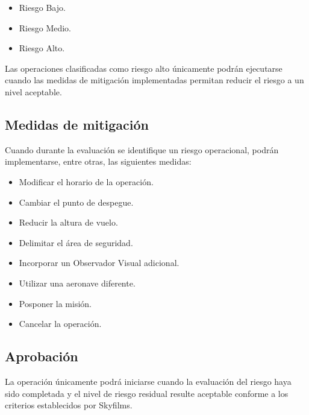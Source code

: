 \begin{itemize}

\item Riesgo Bajo.

\item Riesgo Medio.

\item Riesgo Alto.

\end{itemize}

Las operaciones clasificadas como riesgo alto únicamente podrán ejecutarse cuando las medidas de mitigación implementadas permitan reducir el riesgo a un nivel aceptable.

\subsection{Medidas de mitigación}

Cuando durante la evaluación se identifique un riesgo operacional, podrán implementarse, entre otras, las siguientes medidas:

\begin{itemize}

\item Modificar el horario de la operación.

\item Cambiar el punto de despegue.

\item Reducir la altura de vuelo.

\item Delimitar el área de seguridad.

\item Incorporar un Observador Visual adicional.

\item Utilizar una aeronave diferente.

\item Posponer la misión.

\item Cancelar la operación.

\end{itemize}


\subsection{Aprobación}

La operación únicamente podrá iniciarse cuando la evaluación del riesgo haya sido completada y el nivel de riesgo residual resulte aceptable conforme a los criterios establecidos por Skyfilms.

